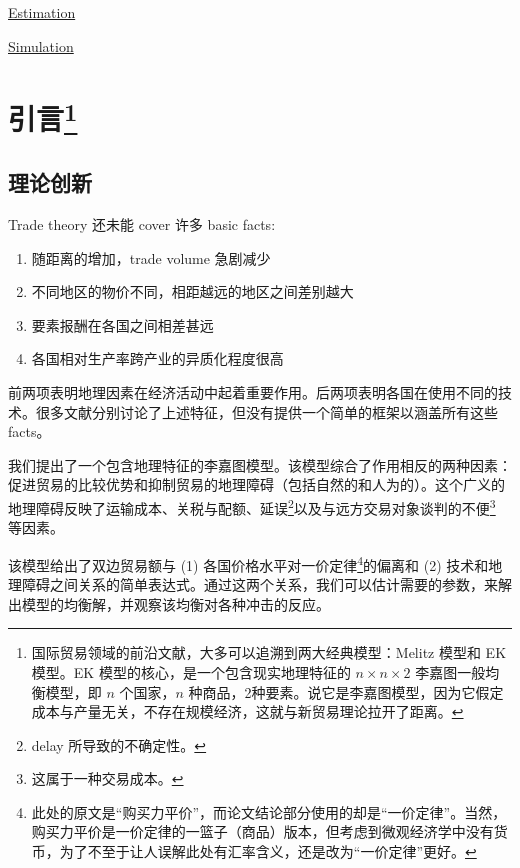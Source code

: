 \documentclass[
]{article}
\providecommand{\tightlist}{%
  \setlength{\itemsep}{0pt}\setlength{\parskip}{0pt}}
\begin{document}
\href{../../EK2002-code/R/src/estimation.html}{Estimation}

\href{../../EK2002-code/R/src/simulation.html}{Simulation}

\hypertarget{ux5f15ux8a001}{%
\section[引言]{\texorpdfstring{引言\footnote{国际贸易领域的前沿文献，大多可以追溯到两大经典模型：Melitz 模型和 EK
  模型。EK 模型的核心，是一个包含现实地理特征的 \(n \times n \times 2\)
  李嘉图一般均衡模型，即 \(n\) 个国家，\(n\)
  种商品，2种要素。说它是李嘉图模型，因为它假定成本与产量无关，不存在规模经济，这就与新贸易理论拉开了距离。}}{引言}}\label{ux5f15ux8a001}}

\hypertarget{ux7406ux8bbaux521bux65b0}{%
\subsection{理论创新}\label{ux7406ux8bbaux521bux65b0}}

Trade theory 还未能 cover 许多 basic facts:

\begin{enumerate}
\def\labelenumi{\arabic{enumi}.}
\tightlist
\item
  随距离的增加，trade volume 急剧减少
\item
  不同地区的物价不同，相距越远的地区之间差别越大
\item
  要素报酬在各国之间相差甚远
\item
  各国相对生产率跨产业的异质化程度很高
\end{enumerate}

前两项表明地理因素在经济活动中起着重要作用。后两项表明各国在使用不同的技术。很多文献分别讨论了上述特征，但没有提供一个简单的框架以涵盖所有这些 facts。

我们提出了一个包含地理特征的李嘉图模型。该模型综合了作用相反的两种因素：促进贸易的比较优势和抑制贸易的地理障碍（包括自然的和人为的）。这个广义的地理障碍反映了运输成本、关税与配额、延误\footnote{delay 所导致的不确定性。}以及与远方交易对象谈判的不便\footnote{这属于一种交易成本。}
等因素。

该模型给出了双边贸易额与 (1) 各国价格水平对一价定律\footnote{此处的原文是``购买力平价''，而论文结论部分使用的却是``一价定律''。当然，购买力平价是一价定律的一篮子（商品）版本，但考虑到微观经济学中没有货币，为了不至于让人误解此处有汇率含义，还是改为``一价定律''更好。}的偏离和 (2)
技术和地理障碍之间关系的简单表达式。通过这两个关系，我们可以估计需要的参数，来解出模型的均衡解，并观察该均衡对各种冲击的反应。
\end{document}
